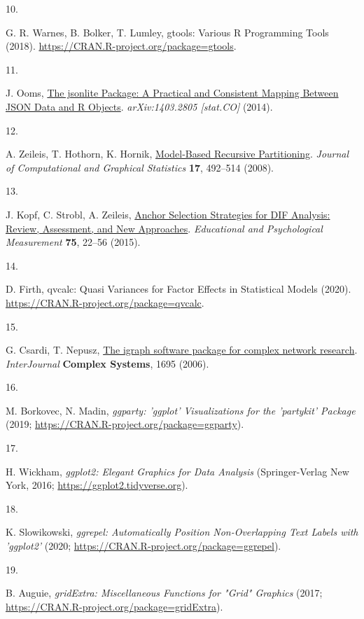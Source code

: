 \documentclass[
]{article}
\newlength{\cslhangindent}
\newlength{\csllabelwidth}
\newenvironment{CSLReferences}[2] %
 {\begin{list}{}{%
  \setlength{\itemindent}{0pt}
  \setlength{\leftmargin}{0pt}
  \setlength{\parsep}{0pt}
  \ifodd #1
   \setlength{\leftmargin}{\cslhangindent}
   \setlength{\itemindent}{-1\cslhangindent}
  \fi
  \setlength{\itemsep}{#2\baselineskip}}}
 {\end{list}}
\newcommand{\CSLLeftMargin}[1]{\parbox[t]{\csllabelwidth}{\strut#1\strut}}
\newcommand{\CSLRightInline}[1]{\parbox[t]{\linewidth - \csllabelwidth}{\strut#1\strut}}
\begin{document}
\begin{CSLReferences}{0}{1}
\CSLLeftMargin{10. }%
\CSLRightInline{G. R. Warnes, B. Bolker, T. Lumley, {{gtools}: Various R
Programming Tools} (2018).
\url{https://CRAN.R-project.org/package=gtools}.}

\CSLLeftMargin{11. }%
\CSLRightInline{J. Ooms, \href{https://arxiv.org/abs/1403.2805}{{The
jsonlite Package: A Practical and Consistent Mapping Between JSON Data
and R Objects}}. \emph{arXiv:1403.2805 {[}stat.CO{]}} (2014).}

\CSLLeftMargin{12. }%
\CSLRightInline{A. Zeileis, T. Hothorn, K. Hornik,
\href{https://doi.org/10.1198/106186008X319331}{{Model-Based Recursive
Partitioning}}. \emph{Journal of Computational and Graphical Statistics}
\textbf{17}, 492--514 (2008).}

\CSLLeftMargin{13. }%
\CSLRightInline{J. Kopf, C. Strobl, A. Zeileis,
\href{https://doi.org/10.1177/0013164414529792}{{Anchor Selection
Strategies for {DIF} Analysis: Review, Assessment, and New Approaches}}.
\emph{Educational and Psychological Measurement} \textbf{75}, 22--56
(2015).}

\CSLLeftMargin{14. }%
\CSLRightInline{D. Firth, {{qvcalc}: Quasi Variances for Factor Effects
in Statistical Models} (2020).
\url{https://CRAN.R-project.org/package=qvcalc}.}

\CSLLeftMargin{15. }%
\CSLRightInline{G. Csardi, T. Nepusz, \href{http://igraph.org}{The
igraph software package for complex network research}.
\emph{InterJournal} \textbf{Complex Systems}, 1695 (2006).}

\CSLLeftMargin{16. }%
\CSLRightInline{M. Borkovec, N. Madin, \emph{{{ggparty}: 'ggplot'
Visualizations for the 'partykit' Package}} (2019;
\url{https://CRAN.R-project.org/package=ggparty}).}

\CSLLeftMargin{17. }%
\CSLRightInline{H. Wickham, \emph{{{ggplot2}: Elegant Graphics for Data
Analysis}} (Springer-Verlag New York, 2016;
\url{https://ggplot2.tidyverse.org}).}

\CSLLeftMargin{18. }%
\CSLRightInline{K. Slowikowski, \emph{{{ggrepel}: Automatically Position
Non-Overlapping Text Labels with 'ggplot2'}} (2020;
\url{https://CRAN.R-project.org/package=ggrepel}).}

\CSLLeftMargin{19. }%
\CSLRightInline{B. Auguie, \emph{{gridExtra: Miscellaneous Functions for
"Grid" Graphics}} (2017;
\url{https://CRAN.R-project.org/package=gridExtra}).}


\end{CSLReferences}
\end{document}

